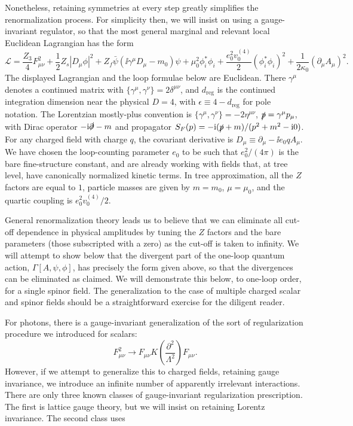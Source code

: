 Nonetheless, retaining symmetries at every step greatly simplifies the
renormalization process. For simplicity then, we will insist on using a
gauge-invariant regulator, so that the most general marginal and relevant local
Euclidean Lagrangian has the form
\[
  \mathcal{L}=\frac{Z_3}{4}F_{\mu\nu}^2
  +\frac{1}{2}Z_s|D_\mu\phi|^2
  +Z_f\bar\psi(\ii\gamma^\mu D_\mu-m_0)\psi
  +\mu_0^2\phi_i^*\phi_i
  +\frac{e_0^2v_0^{(4)}}{2}(\phi_i^*\phi_i)^2
  +\frac{1}{2\kappa_0}(\partial_\mu A_\mu)^2.
\]
The displayed Lagrangian and the loop formulae below are Euclidean. There
$\gamma^\mu$ denotes a continued matrix with
$\{\gamma^\mu,\gamma^\nu\}=2\delta^{\mu\nu}$, and $d_{\mathrm{reg}}$ is the
continued integration dimension near the physical $D=4$, with
$\epsilon\equiv4-d_{\mathrm{reg}}$ for pole notation. The Lorentzian
mostly-plus convention is $\{\gamma^\mu,\gamma^\nu\}=-2\eta^{\mu\nu}$,
$\slashed p=\gamma^\mu p_\mu$, with Dirac operator
$-\mathrm{i}\slashed\partial-m$ and propagator
$S_F(p)=-\mathrm{i}(\slashed p+m)/(p^2+m^2-\mathrm{i}0)$. For any charged field with charge $q$, the covariant derivative is
$D_\mu\equiv\partial_\mu-\ii e_0qA_\mu$. We have chosen the loop-counting
parameter $e_0$ to be such that $e_0^2/(4\pi)$ is the bare fine-structure
constant, and are already working with fields that, at tree level, have
canonically normalized kinetic terms. In tree approximation, all the $Z$ factors
are equal to $1$, particle masses are given by $m=m_0$, $\mu=\mu_0$, and the
quartic coupling is $e_0^2v_0^{(4)}/2$.

General renormalization theory leads us to believe that we can eliminate all
cut-off dependence in physical amplitudes by tuning the $Z$ factors and the bare
parameters (those subscripted with a zero) as the cut-off is taken to infinity.
We will attempt to show below that the divergent part of the one-loop quantum
action, $\Gamma[A,\psi,\phi]$, has precisely the form given above, so that the
divergences can be eliminated as claimed. We will demonstrate this below, to
one-loop order, for a single spinor field. The generalization to the case of
multiple charged scalar and spinor fields should be a straightforward exercise
for the diligent reader.


For photons, there is a gauge-invariant generalization of the sort of
regularization procedure we introduced for scalars:
\[
  F_{\mu\nu}^2\longrightarrow
  F_{\mu\nu}K\!\left(\frac{\partial^2}{\Lambda^2}\right)F_{\mu\nu}.
\]
However, if we attempt to generalize this to charged fields, retaining gauge
invariance, we introduce an infinite number of apparently irrelevant
interactions. There are only three known classes of gauge-invariant
regularization prescription. The first is lattice gauge theory, but we will
insist on retaining Lorentz invariance. The second class uses

